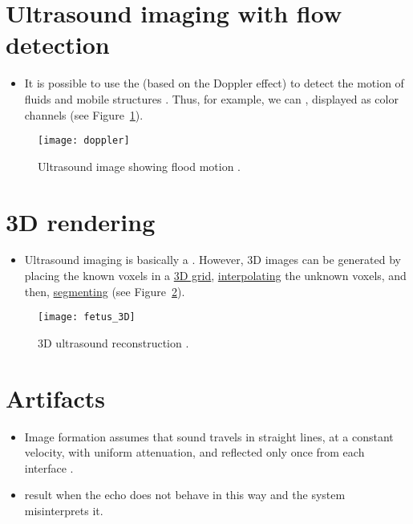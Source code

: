 \section{Ultrasound imaging with flow detection}
\begin{itemize}
\item It is possible to use the  (based
  on the Doppler effect) to detect the motion of fluids and mobile
  structures
  \cite{bushberg2011essential,abdulla2025ultrasound_machine}. Thus,
  for example, we can , displayed as color channels \cite{bushberg2011essential}
  (see Figure~\ref{fig:doppler}).
\end{itemize}
\begin{figure}[!h]
  \centering
  \texttt{[image: doppler]}
  \caption{Ultrasound image showing flood motion
    \cite{abdulla2025ultrasound_imaging_doppler}.\label{fig:doppler}}
\end{figure}

\section{3D rendering}
\begin{itemize}
\item Ultrasound imaging is basically a . However, 3D images can be generated by
  placing the known voxels in a
  \href{https://stackoverflow.com/questions/51907238/how-to-draw-a-2d-3d-grid-from-buffergeometry-in-three-js}{3D
    grid},
  \href{https://en.wikipedia.org/wiki/Trilinear_interpolation}{interpolating}
  the unknown voxels, and then,
  \href{https://en.wikipedia.org/wiki/Image_segmentation}{segmenting}
  (see Figure~\ref{fig:fetus_3D}).
\end{itemize}
\begin{figure}[!h]
  \centering
  \texttt{[image: fetus\_3D]}
  \caption{3D ultrasound reconstruction
    \cite{fetal_diagnostic_centers}.\label{fig:fetus_3D}}
\end{figure}

\section{Artifacts}
\begin{itemize}
\item Image formation assumes that sound travels in straight lines, at
  a constant velocity, with uniform attenuation, and reflected only
  once from each interface \cite{abdulla2025ultrasound_artefacts}.
\item {}
  result when the echo does not behave in this way and the system
  misinterprets it.
\end{itemize}

